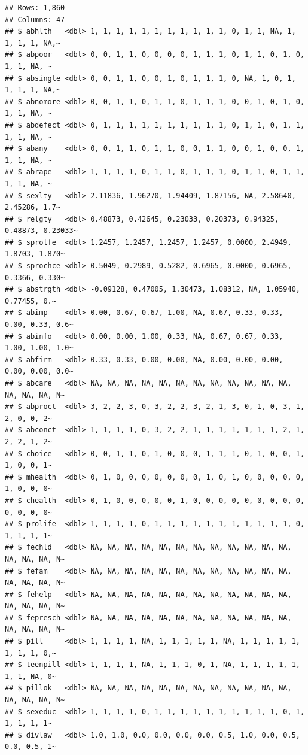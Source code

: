 \documentclass[
]{book}
\begin{document}
\begin{verbatim}
## Rows: 1,860
## Columns: 47
## $ abhlth   <dbl> 1, 1, 1, 1, 1, 1, 1, 1, 1, 1, 1, 0, 1, 1, NA, 1, 1, 1, 1, NA,~
## $ abpoor   <dbl> 0, 0, 1, 1, 0, 0, 0, 0, 1, 1, 1, 0, 1, 1, 0, 1, 0, 1, 1, NA, ~
## $ absingle <dbl> 0, 0, 1, 1, 0, 0, 1, 0, 1, 1, 1, 0, NA, 1, 0, 1, 1, 1, 1, NA,~
## $ abnomore <dbl> 0, 0, 1, 1, 0, 1, 1, 0, 1, 1, 1, 0, 0, 1, 0, 1, 0, 1, 1, NA, ~
## $ abdefect <dbl> 0, 1, 1, 1, 1, 1, 1, 1, 1, 1, 1, 0, 1, 1, 0, 1, 1, 1, 1, NA, ~
## $ abany    <dbl> 0, 0, 1, 1, 0, 1, 1, 0, 0, 1, 1, 0, 0, 1, 0, 0, 1, 1, 1, NA, ~
## $ abrape   <dbl> 1, 1, 1, 1, 0, 1, 1, 0, 1, 1, 1, 0, 1, 1, 0, 1, 1, 1, 1, NA, ~
## $ sexlty   <dbl> 2.11836, 1.96270, 1.94409, 1.87156, NA, 2.58640, 2.45286, 1.7~
## $ relgty   <dbl> 0.48873, 0.42645, 0.23033, 0.20373, 0.94325, 0.48873, 0.23033~
## $ sprolfe  <dbl> 1.2457, 1.2457, 1.2457, 1.2457, 0.0000, 2.4949, 1.8703, 1.870~
## $ sprochce <dbl> 0.5049, 0.2989, 0.5282, 0.6965, 0.0000, 0.6965, 0.3366, 0.330~
## $ abstrgth <dbl> -0.09128, 0.47005, 1.30473, 1.08312, NA, 1.05940, 0.77455, 0.~
## $ abimp    <dbl> 0.00, 0.67, 0.67, 1.00, NA, 0.67, 0.33, 0.33, 0.00, 0.33, 0.6~
## $ abinfo   <dbl> 0.00, 0.00, 1.00, 0.33, NA, 0.67, 0.67, 0.33, 1.00, 1.00, 1.0~
## $ abfirm   <dbl> 0.33, 0.33, 0.00, 0.00, NA, 0.00, 0.00, 0.00, 0.00, 0.00, 0.0~
## $ abcare   <dbl> NA, NA, NA, NA, NA, NA, NA, NA, NA, NA, NA, NA, NA, NA, NA, N~
## $ abproct  <dbl> 3, 2, 2, 3, 0, 3, 2, 2, 3, 2, 1, 3, 0, 1, 0, 3, 1, 2, 0, 0, 2~
## $ abconct  <dbl> 1, 1, 1, 1, 0, 3, 2, 2, 1, 1, 1, 1, 1, 1, 1, 2, 1, 2, 2, 1, 2~
## $ choice   <dbl> 0, 0, 1, 1, 0, 1, 0, 0, 0, 1, 1, 1, 0, 1, 0, 0, 1, 1, 0, 0, 1~
## $ mhealth  <dbl> 0, 1, 0, 0, 0, 0, 0, 0, 0, 1, 0, 1, 0, 0, 0, 0, 0, 1, 0, 0, 0~
## $ chealth  <dbl> 0, 1, 0, 0, 0, 0, 0, 1, 0, 0, 0, 0, 0, 0, 0, 0, 0, 0, 0, 0, 0~
## $ prolife  <dbl> 1, 1, 1, 1, 0, 1, 1, 1, 1, 1, 1, 1, 1, 1, 1, 1, 0, 1, 1, 1, 1~
## $ fechld   <dbl> NA, NA, NA, NA, NA, NA, NA, NA, NA, NA, NA, NA, NA, NA, NA, N~
## $ fefam    <dbl> NA, NA, NA, NA, NA, NA, NA, NA, NA, NA, NA, NA, NA, NA, NA, N~
## $ fehelp   <dbl> NA, NA, NA, NA, NA, NA, NA, NA, NA, NA, NA, NA, NA, NA, NA, N~
## $ fepresch <dbl> NA, NA, NA, NA, NA, NA, NA, NA, NA, NA, NA, NA, NA, NA, NA, N~
## $ pill     <dbl> 1, 1, 1, 1, NA, 1, 1, 1, 1, 1, NA, 1, 1, 1, 1, 1, 1, 1, 1, 0,~
## $ teenpill <dbl> 1, 1, 1, 1, NA, 1, 1, 1, 0, 1, NA, 1, 1, 1, 1, 1, 1, 1, NA, 0~
## $ pillok   <dbl> NA, NA, NA, NA, NA, NA, NA, NA, NA, NA, NA, NA, NA, NA, NA, N~
## $ sexeduc  <dbl> 1, 1, 1, 1, 0, 1, 1, 1, 1, 1, 1, 1, 1, 1, 1, 0, 1, 1, 1, 1, 1~
## $ divlaw   <dbl> 1.0, 1.0, 0.0, 0.0, 0.0, 0.0, 0.5, 1.0, 0.0, 0.5, 0.0, 0.5, 1~

\end{verbatim}
\end{document}

